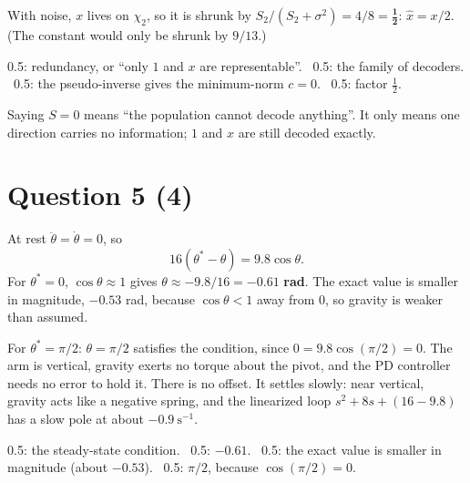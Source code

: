 \documentclass[11pt,letterpaper]{article}
\newcommand{\ans}[1]{\par\vspace{4pt}{\bfseries #1}\quad}
\begin{document}
With noise, $x$ lives on $\chi_2$, so it is shrunk by $S_2/(S_2 + \sigma^2) = 4/8 = \mathbf{\tfrac12}$: $\hat x = x/2$. (The constant would only be shrunk by $9/13$.)
\begin{marking}
0.5: redundancy, or ``only $1$ and $x$ are representable''. \ 0.5: the family of decoders. \ 0.5: the pseudo-inverse gives the minimum-norm $c = 0$. \ 0.5: factor $\tfrac12$.
\end{marking}
\begin{trap}
Saying $S = 0$ means ``the population cannot decode anything''. It only means one direction carries no information; $1$ and $x$ are still decoded exactly.
\end{trap}

\section*{Question 5 \hfill (4)}

\ans{(a) [2]}
At rest $\ddot\theta = \dot\theta = 0$, so
\[
16(\theta^* - \theta) = 9.8\cos\theta.
\]
For $\theta^* = 0$, $\cos\theta \approx 1$ gives $\theta \approx -9.8/16 = \mathbf{-0.61}$ \textbf{rad}. The exact value is smaller in magnitude, $\mathbf{-0.53}$ rad, because $\cos\theta < 1$ away from $0$, so gravity is weaker than assumed.

For $\theta^* = \pi/2$: $\theta = \pi/2$ satisfies the condition, since $0 = 9.8\cos(\pi/2) = 0$. The arm is vertical, gravity exerts no torque about the pivot, and the PD controller needs no error to hold it. There is no offset. It settles slowly: near vertical, gravity acts like a negative spring, and the linearized loop $s^2 + 8s + (16 - 9.8)$ has a slow pole at about $-0.9\ \mathrm{s^{-1}}$.
\begin{marking}
0.5: the steady-state condition. \ 0.5: $-0.61$. \ 0.5: the exact value is smaller in magnitude (about $-0.53$). \ 0.5: $\pi/2$, because $\cos(\pi/2) = 0$.
\end{marking}
\end{document}

